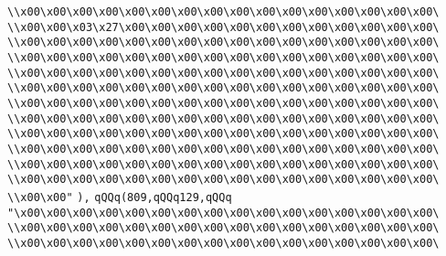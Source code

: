 \verb|\\x00\x00\x00\x00\x00\x00\x00\x00\x00\x00\x00\x00\x00\x00\x00\x00\|\newline
\verb|\\x00\x00\x03\x27\x00\x00\x00\x00\x00\x00\x00\x00\x00\x00\x00\x00\|\newline
\verb|\\x00\x00\x00\x00\x00\x00\x00\x00\x00\x00\x00\x00\x00\x00\x00\x00\|\newline
\verb|\\x00\x00\x00\x00\x00\x00\x00\x00\x00\x00\x00\x00\x00\x00\x00\x00\|\newline
\verb|\\x00\x00\x00\x00\x00\x00\x00\x00\x00\x00\x00\x00\x00\x00\x00\x00\|\newline
\verb|\\x00\x00\x00\x00\x00\x00\x00\x00\x00\x00\x00\x00\x00\x00\x00\x00\|\newline
\verb|\\x00\x00\x00\x00\x00\x00\x00\x00\x00\x00\x00\x00\x00\x00\x00\x00\|\newline
\verb|\\x00\x00\x00\x00\x00\x00\x00\x00\x00\x00\x00\x00\x00\x00\x00\x00\|\newline
\verb|\\x00\x00\x00\x00\x00\x00\x00\x00\x00\x00\x00\x00\x00\x00\x00\x00\|\newline
\verb|\\x00\x00\x00\x00\x00\x00\x00\x00\x00\x00\x00\x00\x00\x00\x00\x00\|\newline
\verb|\\x00\x00\x00\x00\x00\x00\x00\x00\x00\x00\x00\x00\x00\x00\x00\x00\|\newline
\verb|\\x00\x00\x00\x00\x00\x00\x00\x00\x00\x00\x00\x00\x00\x00\x00\x00\|\newline
\verb|\\x00\x00"|\newline
\verb|),|\newline
\verb|qQQq(809,qQQq129,qQQq|\newline
\verb|"\x00\x00\x00\x00\x00\x00\x00\x00\x00\x00\x00\x00\x00\x00\x00\x00\|\newline
\verb|\\x00\x00\x00\x00\x00\x00\x00\x00\x00\x00\x00\x00\x00\x00\x00\x00\|\newline
\verb|\\x00\x00\x00\x00\x00\x00\x00\x00\x00\x00\x00\x00\x00\x00\x00\x00\|\newline
